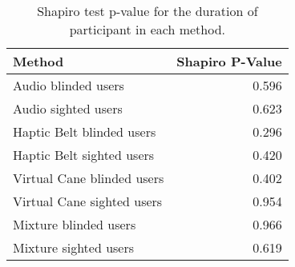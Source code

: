 
\begin{table}[!htb]
\centering
\caption{Shapiro test p-value for the duration of participant in each method.}
\label{tab:shapiro_duration}
\begin{tabular}{lr}
\toprule
                    Method &  Shapiro P-Value \\
\midrule
       Audio blinded users &            0.596 \\
       Audio sighted users &            0.623 \\
 Haptic Belt blinded users &            0.296 \\
 Haptic Belt sighted users &            0.420 \\
Virtual Cane blinded users &            0.402 \\
Virtual Cane sighted users &            0.954 \\
     Mixture blinded users &            0.966 \\
     Mixture sighted users &            0.619 \\
\bottomrule
\end{tabular}
\end{table}

